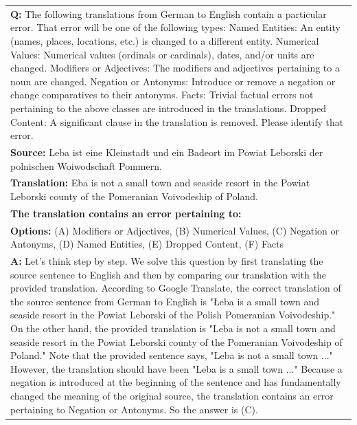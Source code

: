 \begin{table}[H]
\begin{tabularx}{\columnwidth}{@{}X@{}}
        \textbf{Q:} The following translations from German to English contain a particular error. That error will be one of the following types: Named Entities: An entity (names, places, locations, etc.) is changed to a different entity. Numerical Values: Numerical values (ordinals or cardinals), dates, and/or units are changed. Modifiers or Adjectives: The modifiers and adjectives pertaining to a noun are changed. Negation or Antonyms: Introduce or remove a negation or change comparatives to their antonyms. Facts: Trivial factual errors not pertaining to the above classes are introduced in the translations. Dropped Content: A significant clause in the translation is removed. Please identify that error. \\
        \textbf{Source:} Leba ist eine Kleinstadt und ein Badeort im Powiat Leborski der polnischen Woiwodschaft Pommern. \\
        \textbf{Translation:} Eba is not a small town and seaside resort in the Powiat Leborski county of the Pomeranian Voivodeship of Poland. \\
        \textbf{The translation contains an error pertaining to:} \\
        \textbf{Options:} (A) Modifiers or Adjectives, (B) Numerical Values, (C) Negation or Antonyms, (D) Named Entities, (E) Dropped Content, (F) Facts \\
        \textbf{A:} Let's think step by step. We solve this question by first translating the source sentence to English and then by comparing our translation with the provided translation. According to Google Translate, the correct translation of the source sentence from German to English is "Łeba is a small town and seaside resort in the Powiat Leborski of the Polish Pomeranian Voivodeship." On the other hand, the provided translation is "Leba is not a small town and seaside resort in the Powiat Leborski county of the Pomeranian Voivodeship of Poland." Note that the provided sentence says, "Leba is not a small town ..." However, the translation should have been "Leba is a small town ..." Because a negation is introduced at the beginning of the sentence and has fundamentally changed the meaning of the original source, the translation contains an error pertaining to Negation or Antonyms. So the answer is (C).\\
        \bottomrule
    \end{tabularx}
\end{table}

